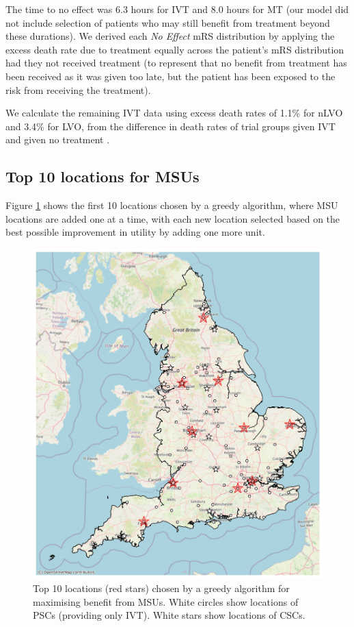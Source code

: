 The time to no effect was 6.3 hours for IVT \cite{emberson_effect_2014} and 8.0 hours for MT \cite{ fransen_time_2016} (our model did not include selection of patients who may still benefit from treatment beyond these durations). We derived each \textit{No Effect} mRS distribution by applying the excess death rate due to treatment equally across the patient’s mRS distribution had they not received treatment (to represent that no benefit from treatment has been received as it was given too late, but the patient has been exposed to the risk from receiving the treatment).

We calculate the remaining IVT data using excess death rates of 1.1\% for nLVO and 3.4\% for LVO, from the difference in death rates of trial groups given IVT and given no treatment \cite{emberson_effect_2014}.

\subsection{Top 10 locations for MSUs}

Figure \ref{fig:top_10} shows the first 10 locations chosen by a greedy algorithm, where MSU locations are added one at a time, with each new location selected based on the best possible improvement in utility by adding one more unit.

\begin{figure}
    \centering
    \includegraphics[width=1.0\linewidth]{images/top_10_msu_map.jpg}
    \caption{Top 10 locations (red stars) chosen by a greedy algorithm for maximising benefit from MSUs. White circles show locations of PSCs (providing only IVT). White stars show locations of CSCs.}
    \label{fig:top_10}
\end{figure}
